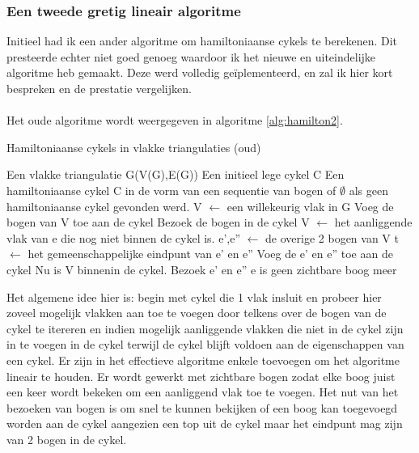 \documentclass[11pt, a4paper, table]{article}
\makeatletter
\newenvironment{algoritme}[1][H]{%
	\renewcommand{\ALG@name}{Algoritme}%
	\renewcommand{\algorithmicrequire}{\textbf{Input:}}
	\renewcommand{\algorithmicensure}{\textbf{Output:}}
	\begin{algorithm}[#1]%
	}{\end{algorithm}}
\theoremstyle{definition}
\theoremstyle{definition}
\theoremstyle{definition}
\makeatother
\begin{document}
\subsubsection{Een tweede gretig lineair algoritme}
Initieel had ik een ander algoritme om hamiltoniaanse cykels te berekenen. Dit presteerde echter niet goed genoeg waardoor ik het nieuwe en uiteindelijke algoritme heb gemaakt. Deze werd volledig ge\"{i}plementeerd, en zal ik hier kort bespreken en de prestatie vergelijken. 
\\\\Het oude algoritme wordt weergegeven in algoritme \ref{alg:hamilton2}.
\begin{tcolorbox}[blanker,float=tbp, grow to left by=2cm,grow to right by=2cm]
	\begin{algoritme}
		\caption{Hamiltoniaanse cykels in vlakke  triangulaties (oud)}
		\label{alg:hamilton2}
		\begin{algorithmic}[1]
			\Require Een vlakke triangulatie G(V(G),E(G))
			\Require Een initieel lege cykel C
			\Ensure Een hamiltoniaanse cykel C in de vorm van een sequentie van bogen of $\emptyset$ als geen hamiltoniaanse cykel gevonden werd.
			\State V $\gets$ een willekeurig vlak in G
			\State Voeg de bogen van V toe aan de cykel
			\State Bezoek de bogen in de cykel
					\State V $\gets$ het aanliggende vlak van e die nog niet binnen de cykel is. 
					\State e',e'' $\gets$ de overige 2 bogen van V
					\State t $\gets$ het gemeenschappelijke eindpunt van e' en e''
						\State Voeg de e' en e'' toe aan de cykel
						\Comment Nu is V binnenin de cykel. 
						\State Bezoek e' en e''
					\Else 
						\State e is geen zichtbare boog meer
					\EndIf 
				\EndFor
			\EndWhile
		\end{algorithmic}
	\end{algoritme}
\end{tcolorbox}
Het algemene idee hier is: begin met cykel die 1 vlak insluit en probeer hier zoveel mogelijk vlakken aan toe te voegen door telkens over de bogen van de cykel te itereren en indien mogelijk aanliggende vlakken die niet in de cykel zijn in te voegen in de cykel terwijl de cykel blijft voldoen aan de eigenschappen van een cykel. Er zijn in het effectieve algoritme enkele toevoegen om het algoritme lineair te houden. Er wordt gewerkt met zichtbare bogen zodat elke boog juist een keer wordt bekeken om een aanliggend vlak toe te voegen. Het nut van het bezoeken van bogen is om snel te kunnen bekijken of een boog kan toegevoegd worden aan de cykel aangezien een top uit de cykel maar het eindpunt mag zijn van 2 bogen in de cykel. 
\end{document}

